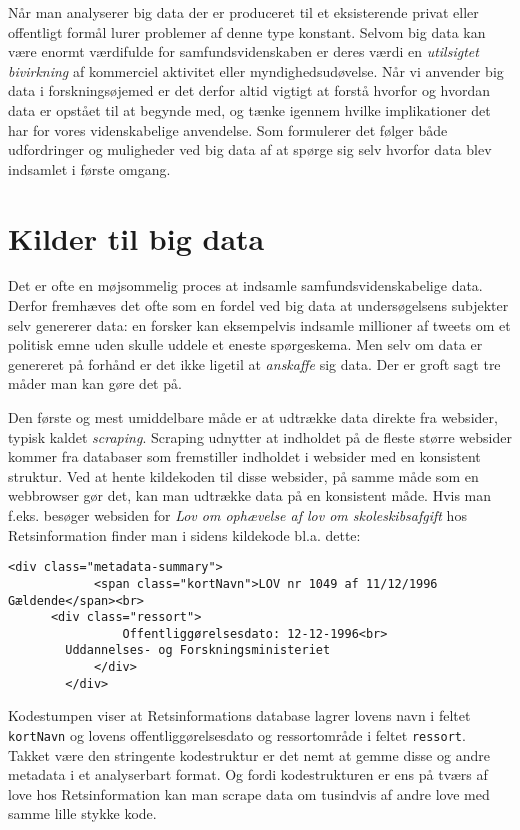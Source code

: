 \documentclass[12pt,]{article}
\begin{document}
Når man analyserer big data der er produceret til et eksisterende privat
eller offentligt formål lurer problemer af denne type konstant. Selvom
big data kan være enormt værdifulde for samfundsvidenskaben er deres
værdi en \emph{utilsigtet bivirkning} af kommerciel aktivitet eller
myndighedsudøvelse. Når vi anvender big data i forskningsøjemed er det
derfor altid vigtigt at forstå hvorfor og hvordan data er opstået til at
begynde med, og tænke igennem hvilke implikationer det har for vores
videnskabelige anvendelse. Som \citet{salganik17} formulerer det følger
både udfordringer og muligheder ved big data af at spørge sig selv
hvorfor data blev indsamlet i første omgang.

\hypertarget{kilder-til-big-data}{%
\section{Kilder til big data}\label{kilder-til-big-data}}

Det er ofte en møjsommelig proces at indsamle samfundsvidenskabelige
data. Derfor fremhæves det ofte som en fordel ved big data at
undersøgelsens subjekter selv genererer data: en forsker kan eksempelvis
indsamle millioner af tweets om et politisk emne uden skulle uddele et
eneste spørgeskema. Men selv om data er genereret på forhånd er det ikke
ligetil at \emph{anskaffe} sig data. Der er groft sagt tre måder man kan
gøre det på.

Den første og mest umiddelbare måde er at udtrække data direkte fra
websider, typisk kaldet \emph{scraping}. Scraping udnytter at indholdet
på de fleste større websider kommer fra databaser som fremstiller
indholdet i websider med en konsistent struktur. Ved at hente kildekoden
til disse websider, på samme måde som en webbrowser gør det, kan man
udtrække data på en konsistent måde. Hvis man f.eks. besøger websiden
for \emph{Lov om ophævelse af lov om skoleskibsafgift} hos
Retsinformation finder man i sidens kildekode bl.a. dette:

\begin{verbatim}
<div class="metadata-summary">
            <span class="kortNavn">LOV nr 1049 af 11/12/1996 Gældende</span><br>
      <div class="ressort">
                Offentliggørelsesdato: 12-12-1996<br>
        Uddannelses- og Forskningsministeriet
            </div>
        </div>
\end{verbatim}

Kodestumpen viser at Retsinformations database lagrer lovens navn i
feltet \texttt{kortNavn} og lovens offentliggørelsesdato og
ressortområde i feltet \texttt{ressort}. Takket være den stringente
kodestruktur er det nemt at gemme disse og andre metadata i et
analyserbart format. Og fordi kodestrukturen er ens på tværs af love hos
Retsinformation kan man scrape data om tusindvis af andre love med samme
lille stykke kode.
\end{document}
